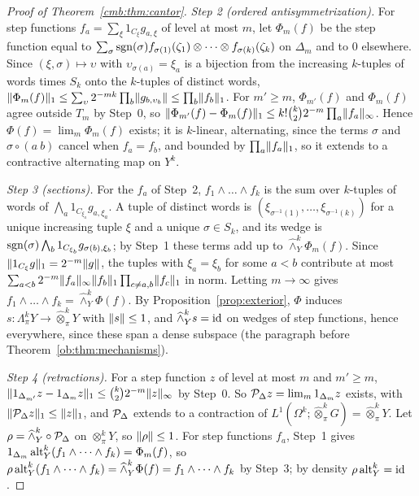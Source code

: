 \begin{proof}[Proof of Theorem~\ref{cmb:thm:cantor}]
\emph{Step 2 (ordered antisymmetrization).} For step functions $f_a=\sum_\xi1_{C_\xi}g_{a,\xi}$ of level at most $m$,
let $\Phi_m(f)$ be the step function equal to $\sum_\sigma\operatorname{sgn}(\sigma)f_{\sigma(1)}(\zeta_1)\otimes\dots\otimes
f_{\sigma(k)}(\zeta_k)$ on $\Delta_m$ and to $0$ elsewhere. Since $(\xi,\sigma)\mapsto\upsilon$ with
$\upsilon_{\sigma(a)}=\xi_a$ is a bijection from the increasing $k$-tuples of words times $S_k$ onto the $k$-tuples of
distinct words, $\lVert \Phi_m(f)\rVert_1\le\sum_\upsilon2^{-mk}\prod_b\lVert g_{b,\upsilon_b}\rVert\le\prod_b\lVert f_b\rVert_1$. For
$m'\ge m$, $\Phi_{m'}(f)$ and $\Phi_m(f)$ agree outside $T_m$ by Step~0, so
$\lVert \Phi_{m'}(f)-\Phi_m(f)\rVert_1\le k!\binom k22^{-m}\prod_a\lVert f_a\rVert_\infty$. Hence $\Phi(f)=\lim_m\Phi_m(f)$ exists; it
is $k$-linear, alternating, since the terms $\sigma$ and $\sigma\circ(a\ b)$ cancel when $f_a=f_b$, and bounded by
$\prod_a\lVert f_a\rVert_1$, so it extends to a contractive alternating map on $Y^k$.

\emph{Step 3 (sections).} For the $f_a$ of Step~2, $f_1\wedge\dots\wedge f_k$ is the sum over $k$-tuples of words of
$\bigwedge_a1_{C_{\xi_a}}g_{a,\xi_a}$. A tuple of distinct words is $(\xi_{\sigma^{-1}(1)},\dots,\xi_{\sigma^{-1}(k)})$
for a unique increasing tuple $\xi$ and a unique $\sigma\in S_k$, and its wedge is
$\operatorname{sgn}(\sigma)\bigwedge_b1_{C_{\xi_b}}g_{\sigma(b),\xi_b}$; by Step~1 these terms add up to $\widehat\wedge^k_Y\Phi_m(f)$.
Since $\lVert 1_{C_\xi}g\rVert_1=2^{-m}\lVert g\rVert$, the tuples with $\xi_a=\xi_b$ for some $a<b$ contribute at most
$\sum_{a<b}2^{-m}\lVert f_a\rVert_\infty\lVert f_b\rVert_1\prod_{c\ne a,b}\lVert f_c\rVert_1$ in norm. Letting $m\to\infty$ gives
$f_1\wedge\dots\wedge f_k=\widehat\wedge^k_Y\Phi(f)$. By Proposition~\ref{prop:exterior}, $\Phi$ induces
$s\colon\Lambda^k_\pi Y\to\widehat\otimes^k_\pi Y$ with $\lVert s\rVert\le1$, and $\widehat\wedge^k_Ys=\mathrm{id}$ on wedges of step
functions, hence everywhere, since these span a dense subspace (the paragraph before Theorem~\ref{ob:thm:mechanisms}).

\emph{Step 4 (retractions).} For a step function $z$ of level at most $m$ and $m'\ge m$,
$\lVert 1_{\Delta_{m'}}z-1_{\Delta_m}z\rVert_1\le\binom k22^{-m}\lVert z\rVert_\infty$ by Step~0. So $\mathcal P_\Delta z=\lim_m1_{\Delta_m}z$
exists, with $\lVert \mathcal P_\Delta z\rVert_1\le\lVert z\rVert_1$, and $\mathcal P_\Delta$ extends to a contraction of
$L^1(\Omega^k;\widehat\otimes^k_\pi G)=\widehat\otimes^k_\pi Y$. Let $\rho=\widehat\wedge^k_Y\circ\mathcal P_\Delta$ on
$\otimes^k_\pi Y$, so $\lVert \rho\rVert\le1$. For step functions $f_a$, Step~1 gives
$1_{\Delta_m}\operatorname{alt}^k_Y(f_1\wedge\dots\wedge f_k)=\Phi_m(f)$, so
$\rho\operatorname{alt}^k_Y(f_1\wedge\dots\wedge f_k)=\widehat\wedge^k_Y\Phi(f)=f_1\wedge\dots\wedge f_k$ by Step~3; by density
$\rho\operatorname{alt}^k_Y=\mathrm{id}$.


\end{proof}
